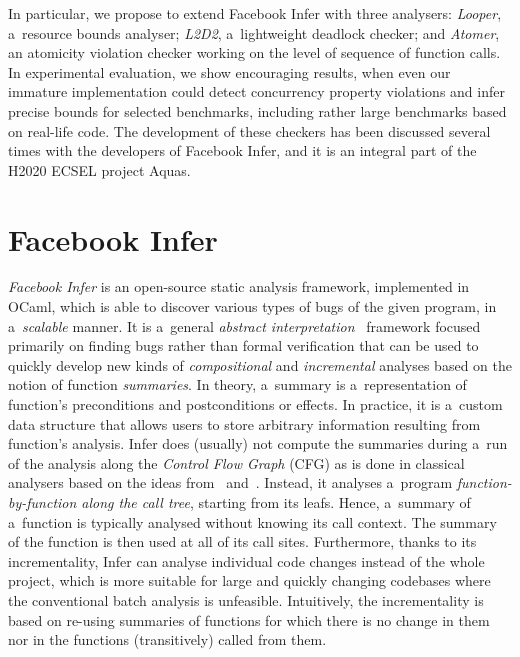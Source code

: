 \documentclass{ExcelAtFIT}
\begin{document}
In particular, we propose to extend Facebook Infer
with three analysers: \emph{Looper}, a~resource
bounds analyser; \emph{L2D2}, a~lightweight
deadlock checker; and \emph{Atomer}, an atomicity
violation checker working on the level of sequence of
function calls. In experimental evaluation, we show
encouraging results, when even our immature
implementation could detect concurrency
property violations and infer precise bounds for
selected benchmarks, including rather large
benchmarks based on real-life code. The development
of these checkers has been discussed several times
with the developers of Facebook Infer, and it is an integral
part of the H2020 ECSEL project Aquas.

\section{Facebook Infer}
\label{sec:infer}

\emph{Facebook Infer} is an open-source static
analysis framework, implemented in OCaml, which is able to discover
various types of bugs of the given program, in
a~\emph{scalable} manner.
It is a~general \emph{abstract
interpretation}~\cite{CousotCousot77-1} framework
focused primarily on finding bugs rather than
formal verification that can be used to quickly
develop new kinds of \emph{compositional} and
\emph{incremental} analyses based on the notion
of function \emph{summaries}. In theory, a~summary
is a~representation of function's preconditions and
postconditions or effects. In practice,
it is a~custom data structure that allows
users to store arbitrary information resulting
from function's analysis. Infer does (usually) not
compute the summaries during a~run of the analysis
along the \emph{Control Flow Graph} (CFG) as is
done in classical analysers based on the ideas
from~\cite{Reps:1995:PID:199448.199462} and~\cite{Sharir:1981:CallStrings}.
Instead, it analyses a~program
\emph{function-by-function along the call tree}, starting
from its leafs. Hence, a~summary of a~function is
typically analysed without knowing its call context.
The summary of the function is
then used at all of its call sites. Furthermore,
thanks to its incrementality, Infer can analyse
individual code changes instead of the whole project,
which is more suitable for large and quickly changing
codebases where the conventional batch analysis is
unfeasible. Intuitively, the incrementality is based
on re-using summaries of functions for which there is
no change in them nor in the functions (transitively)
called from them.
\end{document}
